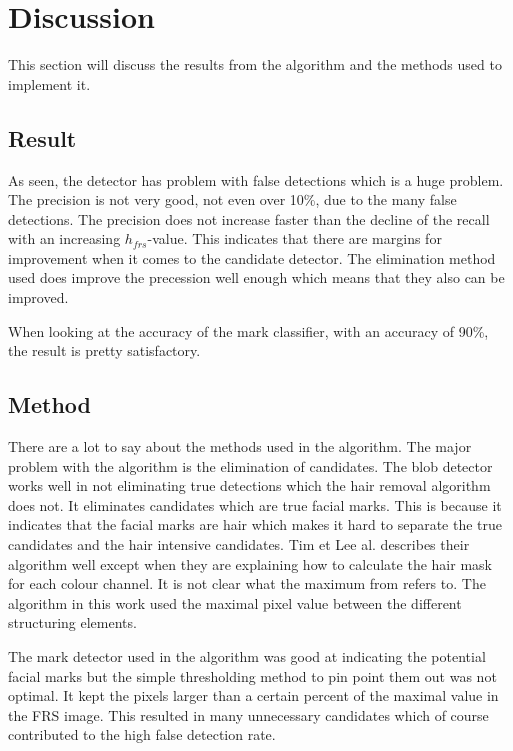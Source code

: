 \chapter{Discussion}\label{cha:Discussion}

This section will discuss the results from the algorithm and the methods used to implement it.

\section{Result}

As seen, the detector has problem with false detections which is a huge problem. The precision is not very good, not even over 10\%, due to the many false detections. The precision does not increase faster than the decline of the recall with an increasing $h_{frs}$-value. This indicates that there are margins for improvement when it comes to the candidate detector. The elimination method used does improve the precession well enough which means that they also can be improved.

When looking at the accuracy of the mark classifier, with an accuracy of 90\%, the result is pretty satisfactory. 


\section{Method}

There are a lot to say about the methods used in the algorithm. The major problem with the algorithm is the elimination of candidates. The blob detector works well in not eliminating true detections which the hair removal algorithm does not. It eliminates candidates which are true facial marks. This is because it indicates that the facial marks are hair which makes it hard to separate the true candidates and the hair intensive candidates. 
Tim et Lee al. describes their algorithm well except when they are explaining how to calculate the hair mask for each colour channel. It is not clear what the maximum from refers to. The algorithm in this work used the maximal pixel value between the different structuring elements. 

The mark detector used in the algorithm was good at indicating the potential facial marks but the simple thresholding method to pin point them out was not optimal. It kept the pixels larger than a certain percent of the maximal value in the FRS image. This resulted in many unnecessary candidates which of course contributed to the high false detection rate. 

